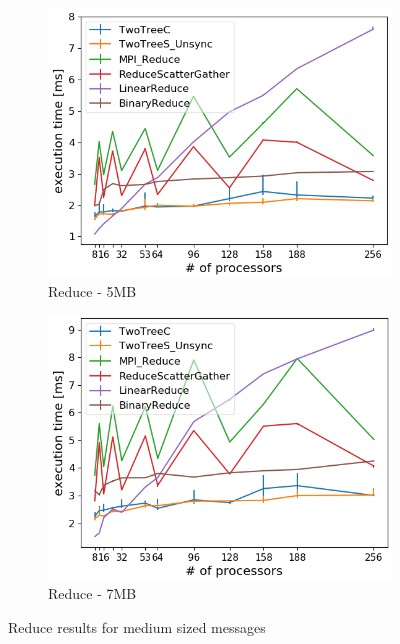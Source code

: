\documentclass[sigplan,review,anonymous]{acmart}\settopmatter{printfolios=true,printccs=false,printacmref=false}
\begin{document}
\begin{figure}
\centering
\begin{subfigure}{.25\textwidth}
  \centering
  \includegraphics[width=1\linewidth]{images/Results/reducefinallinear_5242880B.png}
  \caption{Reduce - 5MB}
  \label{reduce-selected-5MB}
\end{subfigure}%
\begin{subfigure}{.25\textwidth}
  \centering
  \includegraphics[width=1\linewidth]{images/Results/reducefinallinear_7340032B.png}
  \caption{Reduce - 7MB}
  \label{reduce-selected-7MB}
\end{subfigure}
\caption{Reduce results for medium sized messages}
\label{graph-reduce-medium2-selected}
\end{figure}
\end{document}
